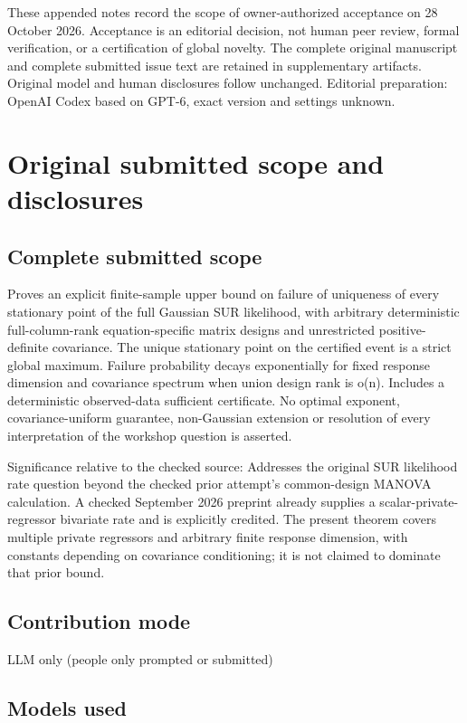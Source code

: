 \documentclass[11pt]{article}
\begin{document}
These appended notes record the scope of owner-authorized acceptance on 28 October 2026. Acceptance is an editorial decision, not human peer review, formal verification, or a certification of global novelty. The complete original manuscript and complete submitted issue text are retained in supplementary artifacts. Original model and human disclosures follow unchanged. Editorial preparation: OpenAI Codex based on GPT-6, exact version and settings unknown.

\section{Original submitted scope and disclosures}

\subsection{Complete submitted scope}

Proves an explicit finite-sample upper bound on failure of uniqueness of every stationary point of the full Gaussian SUR likelihood, with arbitrary deterministic full-column-rank equation-specific matrix designs and unrestricted positive-definite covariance. The unique stationary point on the certified event is a strict global maximum. Failure probability decays exponentially for fixed response dimension and covariance spectrum when union design rank is o(n). Includes a deterministic observed-data sufficient certificate. No optimal exponent, covariance-uniform guarantee, non-Gaussian extension or resolution of every interpretation of the workshop question is asserted.

Significance relative to the checked source: Addresses the original SUR likelihood rate question beyond the checked prior attempt's common-design MANOVA calculation. A checked September 2026 preprint already supplies a scalar-private-regressor bivariate rate and is explicitly credited. The present theorem covers multiple private regressors and arbitrary finite response dimension, with constants depending on covariance conditioning; it is not claimed to dominate that prior bound.

\subsection{Contribution mode}

LLM only (people only prompted or submitted)

\subsection{Models used}
\end{document}
